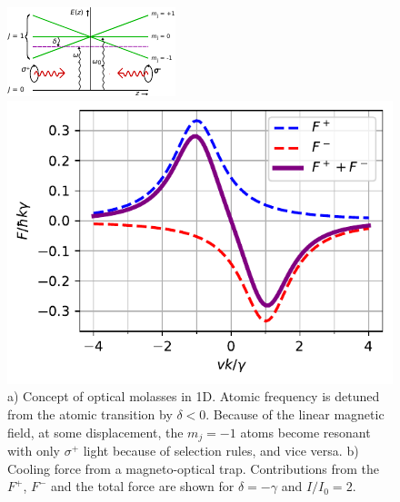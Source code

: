 \begin{figure}
\centering
	\begin{minipage}{.49\textwidth}
		\centering
		\includegraphics[width=\linewidth]{figures/OpticalMolasses.pdf}
	\end{minipage}
	\begin{minipage}{.48\textwidth}
		\centering
		\includegraphics[width=\linewidth]{figures/MOTplot.pdf}
	\end{minipage}
	\caption{a) Concept of optical molasses in 1D. Atomic frequency is detuned from the atomic transition by $\delta<0$. Because of the linear magnetic field, at some displacement, the $m_j=-1$ atoms become resonant with only $\sigma^+$ light because of selection rules, and vice versa. b) Cooling force from a magneto-optical trap. Contributions from the $F^+$, $F^-$ and the total force are shown for $\delta = -\gamma$ and $I/I_0 = 2.$}
		\label{fig:MOTdamping}
\end{figure}

